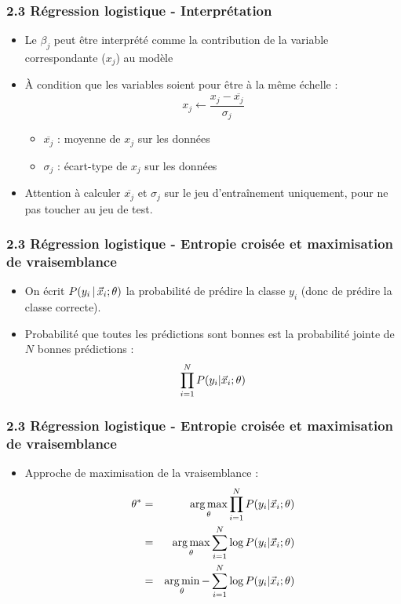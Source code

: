 \begin{frame}
  \frametitle{2.3 Régression logistique - Interprétation}
  \begin{itemize}
  \item Le 
    $\beta_j$ peut être interprété comme la contribution de la variable correspondante ($x_j$) au modèle
  \item À condition que les variables soient  pour être à la même échelle :
    \[
      x_j \leftarrow \frac{x_j - \overline{x_j}}{\sigma_j}
    \]
    \begin{itemize}
    \item $\overline{x_j}$ : moyenne de $x_j$ sur les données
    \item $\sigma_j$ : écart-type de $x_j$ sur les données
    \end{itemize}
  \item Attention à calculer $\overline{x_j}$ et $\sigma_j$ sur le jeu
    d'entraînement uniquement, pour ne pas toucher au jeu de test.
  \end{itemize}
\end{frame}

\begin{frame}
  \frametitle{2.3 Régression logistique - Entropie croisée et maximisation de vraisemblance}
  \begin{itemize}
    \item On écrit $P(y_i\,|\,\vec{x}_i; \theta)$ la probabilité de prédire la classe $y_i$ (donc de prédire la classe correcte). 
  \item Probabilité que toutes les prédictions sont bonnes est la probabilité jointe de $N$ bonnes prédictions :  
  \begin{equation*}
    \prod_{i=1}^NP(y_i | \vec{x}_i; \theta)
  \end{equation*}
  \end{itemize}
\end{frame}

\begin{frame}
  \frametitle{2.3 Régression logistique - Entropie croisée et maximisation de vraisemblance}
  \begin{itemize}
    \item Approche de maximisation de la vraisemblance : 
    \begin{eqnarray*}
    \theta^{\ast} &=& \operatorname*{arg\,max}_{\theta} \prod_{i=1}^NP(y_i | \vec{x}_i; \theta) \\
                  &=& \operatorname*{arg\,max} _{\theta} \sum_{i=1}^N\log P(y_i | \vec{x}_i; \theta)\\
                  &=& \operatorname*{arg\,min}_{\theta} - \sum_{i=1}^N\log P(y_i | \vec{x}_i; \theta)
    \end{eqnarray*}    
  \end{itemize}
\end{frame}

